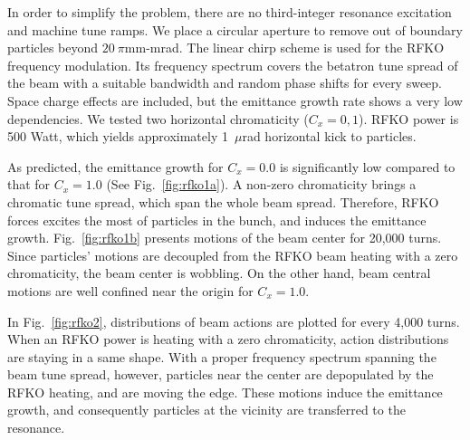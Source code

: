 \documentclass[aps,prstab,onecolumn,preprint]{revtex4-1}
\begin{document}
In order to simplify the problem, there are no third-integer resonance excitation and machine tune ramps. We place a circular aperture to remove out of boundary particles beyond $20~\pi$mm-mrad. The linear chirp scheme is used for the RFKO frequency modulation. Its frequency spectrum covers the betatron tune spread of the beam with a suitable bandwidth and random phase shifts for every sweep. Space charge effects are included, but the emittance growth rate shows a very low dependencies. We tested two horizontal chromaticity ($C_{x} = 0,1$). RFKO power is 500 Watt, which yields approximately 1~$\mu$rad horizontal kick to particles. 

As predicted, the emittance growth for $C_{x}=0.0$ is significantly low compared to that for $C_{x}=1.0$ (See Fig.~\ref{fig:rfko1a}). A non-zero chromaticity brings a chromatic tune spread, which span the whole beam spread. Therefore, RFKO forces excites the most of particles in the bunch, and induces the emittance growth. Fig.~\ref{fig:rfko1b} presents motions of the beam center for 20,000 turns. Since particles' motions are decoupled from the RFKO beam heating with a zero chromaticity, the beam center is wobbling. On the other hand, beam central motions are well confined near the origin for $C_{x}=1.0$.

In Fig.~\ref{fig:rfko2}, distributions of beam actions are plotted for every 4,000 turns. When an RFKO power is heating with a zero chromaticity, action distributions are staying in a same shape. With a proper frequency spectrum spanning the beam tune spread, however, particles near the center are depopulated by the RFKO heating, and are moving the edge. These motions induce the emittance growth, and consequently particles at the vicinity are transferred to the resonance.
\end{document}
